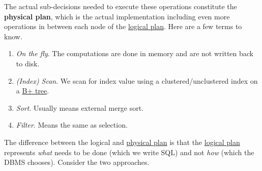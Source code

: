     \begin{definition}
      \label{def:physical-plan}
      The actual sub-decisions needed to execute these operations constitute the \textbf{physical plan}, which is the actual implementation including even more operations in between each node of the \hyperref[def:logical-plan]{logical plan}. Here are a few terms to know. 
      \begin{enumerate}
        \item \textit{On the fly}. The computations are done in memory and are not written back to disk. 
        \item \textit{(Index) Scan}. We scan for index value using a clustered/unclustered index on a \hyperref[def:b-tree-2]{B+ tree}. 
        \item \textit{Sort}. Usually means external merge sort. 
        \item \textit{Filter}. Means the same as selection. 
      \end{enumerate}
    \end{definition}

    The difference between the logical and \hyperref[def:physical-plan]{physical plan} is that the \hyperref[def:logical-plan]{logical plan} represents \textit{what} needs to be done (which we write SQL) and not \textit{how} (which the DBMS chooses). Consider the two approaches. 


